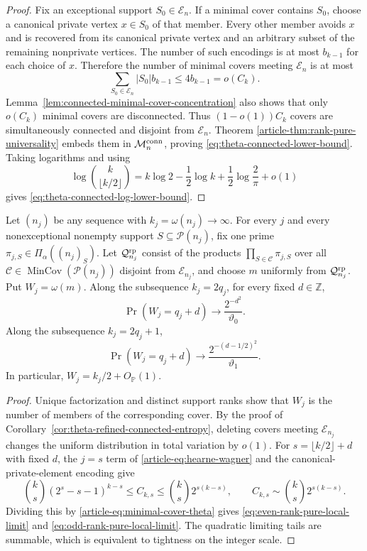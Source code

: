 \begin{proof}
Fix an exceptional support $S_0\in\mathcal E_n$. If a minimal cover contains
$S_0$, choose a canonical private vertex $x\in S_0$ of that member. Every
other member avoids $x$ and is recovered from its canonical private vertex and
an arbitrary subset of the remaining nonprivate vertices. The number of such
encodings is at most $b_{k-1}$ for each choice of $x$. Therefore the number of
minimal covers meeting $\mathcal E_n$ is at most
\[
 \sum_{S_0\in\mathcal E_n}|S_0|b_{k-1}\le4b_{k-1}=o(C_k).
\]
Lemma~\ref{lem:connected-minimal-cover-concentration} also shows that only
$o(C_k)$ minimal covers are disconnected. Thus $(1-o(1))C_k$ covers are simultaneously
connected and disjoint from $\mathcal E_n$. Theorem
\ref{article-thm:rank-pure-universality} embeds them in
$\mathcal M_n^{\rm conn}$, proving \eqref{eq:theta-connected-lower-bound}.
Taking logarithms and using
\[
 \log\binom{k}{\lfloor k/2\rfloor}
 =k\log2-\frac12\log k+\frac12\log\frac2\pi+o(1)
\]
gives \eqref{eq:theta-connected-log-lower-bound}.
\end{proof}

\begin{corollary}
\label{cor:rank-pure-local-limit}
Let $(n_j)$ be any sequence with $k_j=\omega(n_j)\to\infty$. For every
$j$ and every nonexceptional nonempty support
$S\subseteq\mathcal P(n_j)$, fix one prime
$\pi_{j,S}\in\Pi_\alpha((n_j)_S)$. Let $\mathcal Q_{n_j}^{\rm rp}$ consist of the
products $\prod_{S\in\mathcal C}\pi_{j,S}$ over all
$\mathcal C\in\operatorname{MinCov}(\mathcal P(n_j))$ disjoint from
$\mathcal E_{n_j}$, and choose $m$ uniformly from $\mathcal Q_{n_j}^{\rm rp}$. Put
$W_j=\omega(m)$. Along the subsequence $k_j=2q_j$, for every fixed
$d\in\mathbb Z$,
\begin{equation}\label{eq:even-rank-pure-local-limit}
 \Pr(W_j=q_j+d)\longrightarrow\frac{2^{-d^2}}{\vartheta_0}.
\end{equation}
Along the subsequence $k_j=2q_j+1$,
\begin{equation}\label{eq:odd-rank-pure-local-limit}
 \Pr(W_j=q_j+d)\longrightarrow
 \frac{2^{-(d-1/2)^2}}{\vartheta_1}.
\end{equation}
In particular, $W_j=k_j/2+O_{\mathbb P}(1)$.
\end{corollary}

\begin{proof}
Unique factorization and distinct support ranks show that $W_j$ is the number
of members of the corresponding cover. By the proof of
Corollary~\ref{cor:theta-refined-connected-entropy}, deleting covers meeting
$\mathcal E_{n_j}$ changes the uniform distribution in total variation by
$o(1)$. For $s=\lfloor k/2\rfloor+d$ with fixed $d$, the $j=s$ term of
\eqref{article-eq:hearne-wagner} and the canonical-private-element encoding give
\[
 \binom{k}{s}(2^s-s-1)^{k-s}
 \le C_{k,s}\le \binom{k}{s}2^{s(k-s)},
 \qquad
 C_{k,s}\sim\binom{k}{s}2^{s(k-s)}.
\]
Dividing this by \eqref{article-eq:minimal-cover-theta} gives
\eqref{eq:even-rank-pure-local-limit} and
\eqref{eq:odd-rank-pure-local-limit}. The quadratic limiting tails are
summable, which is equivalent to tightness on the integer scale.
\end{proof}

